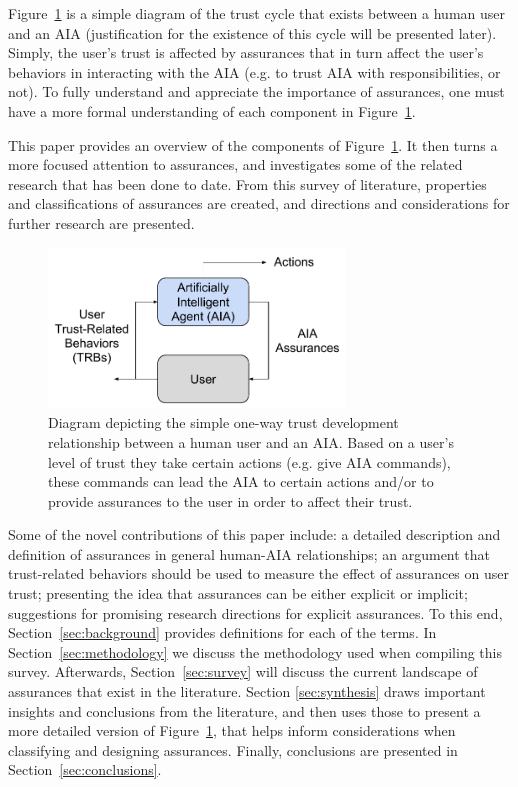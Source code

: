     Figure~\ref{fig:SimpleTrust_one_way} is a simple diagram of the trust cycle that exists between a human user and an AIA (justification for the existence of this cycle will be presented later). Simply, the user's trust is affected by assurances that in turn affect the user's behaviors in interacting with the AIA (e.g. to trust AIA with responsibilities, or not). To fully understand and appreciate the importance of assurances, one must have a more formal understanding of each component in Figure~\ref{fig:SimpleTrust_one_way}.

    This paper provides an overview of the components of Figure~\ref{fig:SimpleTrust_one_way}. It then turns a more focused attention to assurances, and investigates some of the related research that has been done to date. From this survey of literature, properties and classifications of assurances are created, and directions and considerations for further research are presented.

    \begin{figure}
        \centering
        \includegraphics[width=0.7\textwidth]{Figures/SimpleTrust_one_way}
        \caption{Diagram depicting the simple one-way trust development relationship between a human user and an AIA. Based on a user's level of trust they take certain actions (e.g. give AIA commands), these commands can lead the AIA to certain actions and/or to provide assurances to the user in order to affect their trust.}
        \label{fig:SimpleTrust_one_way}
    \end{figure}

    Some of the novel contributions of this paper include: a detailed description and definition of assurances in general human-AIA relationships; an argument that trust-related behaviors should be used to measure the effect of assurances on user trust; presenting the idea that assurances can be either explicit or implicit; suggestions for promising research directions for explicit assurances. To this end, Section~\ref{sec:background} provides definitions for each of the terms. In Section~\ref{sec:methodology} we discuss the methodology used when compiling this survey. Afterwards, Section~\ref{sec:survey} will discuss the current landscape of assurances that exist in the literature. Section \ref{sec:synthesis} draws important insights and conclusions from the literature, and then uses those to present a more detailed version of Figure~\ref{fig:SimpleTrust_one_way}, that helps inform considerations when classifying and designing assurances. Finally, conclusions are presented in Section~\ref{sec:conclusions}.
